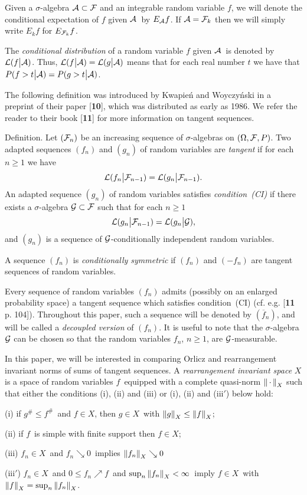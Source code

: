 Given a $\sigma$-algebra ${\cal A}\subset{\cal F}$ and an integrable random
variable $f$, we
will denote the conditional expectation of $f$ given ${\cal A}$\ by
$E_{\cal
A}f$. If ${\cal A}={\cal F}_k$ then we will simply write $E_kf$ for
$E_{{\cal
F}_k}f$.

The {\it conditional
distribution\/} of a random variable $f$ given ${\cal A}$\ is denoted 
by ${\cal L}(f\big |{\cal A})$. Thus, ${\cal L}(f\big |{\cal A})= {\cal
L}(g\big |{\cal A})$ means that for each real number $t$ we have that
$P(f>t\big | {\cal A})=P(g>t\big | {\cal A})$. 

The following definition was
introduced by Kwapie\'n and Woyczy\'nski in a preprint of their paper
[{\bf 10}], which was distributed as early as 1986. We refer the reader to
their book [{\bf 11}] for more
information on tangent sequences.

\proclaim Definition. {\rm Let $({\cal F}_n)$ be an increasing sequence of
$\sigma$-algebras on $(\Omega ,{\cal F},P)$.  Two adapted sequences
$(f_n)$ and $(g_n)$ of random variables are {\it tangent\/} if for each
$n\ge 1$ we have
$${\cal L}(f_n\big |{\cal F}_{n-1})=
{\cal L}(g_n\big |{\cal F}_{n-1}).$$
 An adapted sequence $(g_n)$ of random variables satisfies {\it
condition~(CI)\/} if there exists a $\sigma$-algebra ${\cal G}\subset {\cal
F}$ such that for each $n\ge1$ $${\cal L}(g_n\big |{\cal F}_{n-1})= {\cal
L}(g_n\big |{\cal G}),$$
and $(g_n)$ is a sequence of ${\cal G}$-conditionally independent
random variables.\moreproclaim}

\noindent A sequence $(f_n)$ is {\it conditionally symmetric\/} if $(f_n)$
and $(-f_n)$ are tangent sequences of random variables. 

Every sequence of random variables $(f_n)$ admits (possibly on an enlarged
probability space) a tangent sequence which satisfies condition~(CI) (cf.
e.g. [{\bf 11} p. 104]). Throughout this paper,
such a sequence will be denoted by $(\overline{f}_n)$, and will be called a
{\it decoupled version\/} of $(f_n)$. It is useful to note that the
$\sigma$-algebra ${\cal G}$ can be chosen so that the random variables
$f_n$, $n \ge 1$, are ${\cal G}$-measurable. 

In this paper, we will be interested in comparing Orlicz and 
rearrangement invariant norms of sums of tangent sequences. A {\it
rearrangement invariant space} $X$ is a space of random variables $f$\
equipped with a complete quasi-norm $\left\|\,\cdot\,\right\|_X$ such that 
either the conditions (i), (ii) and (iii) or (i), (ii) and (iii$'$) below 
 hold: \item{(i)} if $g^{\#} \le f^{\#}$\ and $f \in X$, then $g
\in X$\ with $\left\|g\right\|_X \le \left\|f\right\|_X$; \item{(ii)} if $f$\ is simple
with finite support then $f \in X$; \item{(iii)}  $f_n \in X$\ and
$f_n \searrow 0$\ implies $\left\|f_n\right\|_X \searrow 0$ \item{(iii$'$)} 
$f_n \in X$\ and $0 \le f_n \nearrow f$\ and $\sup_n \left\|f_n\right\|_X <
\infty$\ imply $f \in X$\ with $\left\|f\right\|_X = \sup_n \left\|f_n\right\|_X$.

